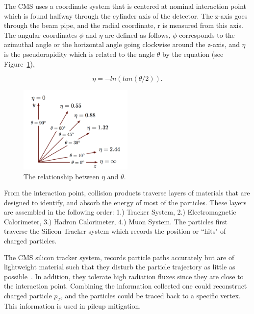 The CMS uses a coordinate system that is centered at nominal interaction point which is found halfway through the cylinder axis of the detector. The z-axis goes through the beam pipe, and the radial coordinate, r is measured from this axis. The angular coordinates $\phi$ and $\eta$ are defined as follows, $\phi$ corresponds to the azimuthal angle or the horizontal angle going clockwise around the z-axis, and $\eta$ is the pseudorapidity which is related to the angle $\theta$ by the equation (see Figure~\ref{fig:etatheta}),

\begin{equation}
    \eta = -ln (tan(\theta/2)).
\end{equation}

\begin{figure}[tbp!]
\caption{The relationship between $\eta$ and $\theta$.}
\begin{center}
\includegraphics[angle=0,width=0.50\textwidth]{fig/pseudorapidity.png}
\end{center}
\label{fig:etatheta}
\end{figure}


From the interaction point, collision products traverse layers of materials that are designed to identify, and absorb the energy of most of the particles. These layers are assembled in the following order: 1.) Tracker System, 2.) Electromagnetic Calorimeter, 3.) Hadron Calorimeter, 4.) Muon System. The particles first traverse the Silicon Tracker system which records the position or ``hits" of charged particles. 


The CMS silicon tracker system, records particle paths accurately but are of lightweight material such that they disturb the particle trajectory as little as possible~\cite{CMS:2008xjf}. In addition, they tolerate high radiation fluxes since they are close to the interaction point. Combining the information collected one could reconstruct charged particle $p_T$, and the particles could be traced back to a specific vertex. This information is used in pileup mitigation. 

